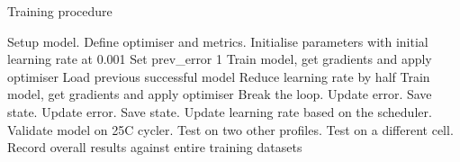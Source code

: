 \begin{algorithm}
    \caption{Training procedure}
        \begin{algorithmic}[1]
            \STATE Setup model. Define optimiser and metrics.
            \STATE Initialise parameters with initial learning rate at 0.001
            \STATE Set prev\_error 1
                \STATE Train model, get gradients and apply optimiser
                        \STATE Load previous successful model
                        \STATE Reduce learning rate by half
                        \STATE Train model, get gradients and apply optimiser
                            \STATE Break the loop. Update error. Save state.
                        \ENDIF
                    \ENDWHILE
                \ELSE
                    \STATE Update error. Save state.
                    \STATE Update learning rate based on the scheduler.
                \ENDIF
                \STATE Validate model on 25\textdegree{}C cycler.
                \STATE Test on two other profiles.
                \STATE Test on a different cell.
            \ENDWHILE
            \STATE Record overall results against entire training datasets
        \end{algorithmic}
    \label{alg:training}
\end{algorithm}

